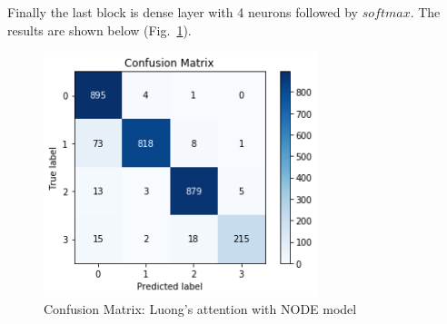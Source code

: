 \documentclass[LaM,binding=0.6cm]{sapthesis}
\begin{document}
Finally the last block is dense layer with 4 neurons followed by $softmax$.
The results are shown below (Fig.~\ref{fig:lstmat3}).
\begin{figure}  \centering
    \includegraphics[width=80mm,scale=0.7]{lstmat3}
    \caption{Confusion Matrix: Luong's attention with NODE model}
    \label{fig:lstmat3}
\end{figure}
\end{document}
